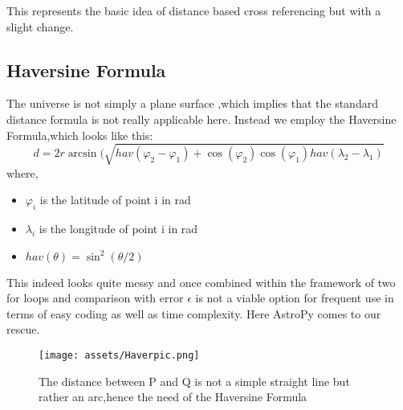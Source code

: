 \documentclass{article}
\begin{document}
    
    This represents the basic idea of distance based cross referencing but with a slight change.
    \subsection{Haversine Formula}
    The universe is not simply a  plane surface ,which implies that the standard distance formula is not really applicable here.
    Instead we employ the Haversine Formula,which looks like this:
    \[d=2r\arcsin(\sqrt{hav(\varphi_2-\varphi_1)+\cos(\varphi_2)\cos(\varphi_1)hav(\lambda_2-\lambda_1)}\]
    where,
            \begin{itemize}
                \item \(\varphi_i\) is the latitude of point i in rad
                \item \(\lambda_i\) is the longitude of point i in rad
                \item \(hav(\theta)=\sin^2{(\theta/2)}\)
                \end{itemize}
    This indeed looks quite messy and once combined within the framework of two for loops and  comparison with  error \(\epsilon\) is not a viable option for frequent use in terms of easy coding as well as time complexity.
    Here AstroPy comes to our rescue.
    \begin{figure}[htp]
        \centering
        \texttt{[image: assets/Haverpic.png]}
        \caption{The distance between P and Q is not a simple straight line but rather an arc,hence the need of the Haversine Formula}
        \label{fig:Haverdist}
    \end{figure}
\end{document}
